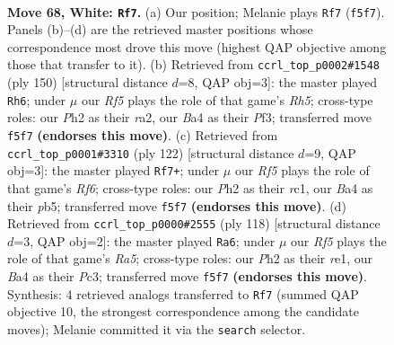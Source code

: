 \documentclass[11pt]{article}
\begin{document}
\clearpage

\begin{figure}[p]\centering
\begin{subfigure}{0.46\textwidth}\centering
\resizebox{\linewidth}{!}{%
\newchessgame
\chessboard[
  setfen={8/8/1k6/5R2/B4P2/4K3/7P/8 w - - 1 68},
  showmover=false,
  pgfstyle=straightmove, color=movearrow, markmove={f5-f7}
]}
\caption{}
\end{subfigure}\hfill
\begin{subfigure}{0.46\textwidth}\centering
\resizebox{\linewidth}{!}{%
\newchessgame
\chessboard[
  setfen={8/5k2/8/7R/7P/5PK1/r7/8 w - - 3 76},
  showmover=false,
  pgfstyle=straightmove, color=movearrow, markmove={h5-h6}
]}
\caption{}
\end{subfigure}
\\[4pt]
\begin{subfigure}{0.46\textwidth}\centering
\resizebox{\linewidth}{!}{%
\newchessgame
\chessboard[
  setfen={8/3k4/5R2/1p3P2/8/8/5K2/2r5 w - - 7 62},
  showmover=false,
  pgfstyle=straightmove, color=movearrow, markmove={f6-f7}
]}
\caption{}
\end{subfigure}\hfill
\begin{subfigure}{0.46\textwidth}\centering
\resizebox{\linewidth}{!}{%
\newchessgame
\chessboard[
  setfen={8/3k4/8/R7/P7/2P5/2K5/4r3 w - - 13 60},
  showmover=false,
  pgfstyle=straightmove, color=movearrow, markmove={a5-a6}
]}
\caption{}
\end{subfigure}
\caption{\textbf{Move 68, White: \texttt{Rf7}.} (a) Our position; Melanie plays \texttt{Rf7} (\texttt{f5f7}). Panels (b)--(d) are the retrieved master positions whose correspondence most drove this move (highest QAP objective among those that transfer to it). (b) Retrieved from \texttt{ccrl\_top\_p0002\#1548} (ply 150) [structural distance $d$=8, QAP obj=3]: the master played \texttt{Rh6}; under $\mu$ our \emph{Rf5} plays the role of that game's \emph{Rh5}; cross-type roles: our \emph{P}h2 as their \emph{r}a2, our \emph{B}a4 as their \emph{P}f3; transferred move \texttt{f5f7} \textbf{(endorses this move)}. (c) Retrieved from \texttt{ccrl\_top\_p0001\#3310} (ply 122) [structural distance $d$=9, QAP obj=3]: the master played \texttt{Rf7+}; under $\mu$ our \emph{Rf5} plays the role of that game's \emph{Rf6}; cross-type roles: our \emph{P}h2 as their \emph{r}c1, our \emph{B}a4 as their \emph{p}b5; transferred move \texttt{f5f7} \textbf{(endorses this move)}. (d) Retrieved from \texttt{ccrl\_top\_p0000\#2555} (ply 118) [structural distance $d$=3, QAP obj=2]: the master played \texttt{Ra6}; under $\mu$ our \emph{Rf5} plays the role of that game's \emph{Ra5}; cross-type roles: our \emph{P}h2 as their \emph{r}e1, our \emph{B}a4 as their \emph{P}c3; transferred move \texttt{f5f7} \textbf{(endorses this move)}. Synthesis: 4 retrieved analogs transferred to \texttt{Rf7} (summed QAP objective 10, the strongest correspondence among the candidate moves); Melanie committed it via the \texttt{search} selector.}
\label{fig:thought-m134}
\end{figure}
\end{document}
